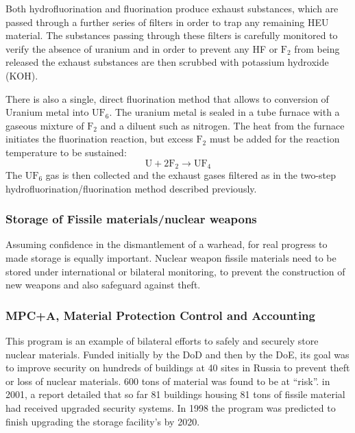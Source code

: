 \documentclass[twoside,titlepage,11pt,twocolumn,a4paper]{article}
\begin{document}
Both hydrofluorination and fluorination produce exhaust substances,
which are passed through a further series of filters in order to trap
any remaining HEU material. The substances passing through these
filters is carefully monitored to verify the absence of uranium and in
order to prevent any HF or \(\mathrm{F_2}\) from being released the
exhaust substances are then scrubbed with potassium hydroxide (KOH).

There is also a single, direct fluorination method that allows to
conversion of Uranium metal into \(\mathrm{UF_6}\). The uranium metal
is sealed in a tube furnace with a gaseous mixture of \(\mathrm{F_2}\)
and a diluent such as nitrogen. The heat from the furnace initiates
the fluorination reaction, but excess \(\mathrm{F_2}\) must be added
for the reaction temperature to be sustained: 
\[ \mathrm{ U + 2F_2 \rightarrow UF_4 } \]
The \(\mathrm{UF_6}\) gas is then collected and the exhaust gases
filtered as in the two-step hydrofluorination/fluorination method
described previously. \citep{dilutingUranium}

\subsubsection{Storage of Fissile materials/nuclear weapons}
Assuming confidence in the dismantlement of a warhead, for real
progress to made storage is equally important. Nuclear weapon fissile
materials need to be stored under international or bilateral
monitoring, to prevent the construction of new weapons and also
safeguard against theft.

\subsubsection{MPC+A, Material Protection Control and Accounting}
This program is an example of bilateral efforts to safely and securely
store nuclear materials. Funded initially by the DoD and then by the
DoE, its goal was to improve security on hundreds of buildings at 40
sites in Russia to prevent theft or loss of nuclear materials. 600
tons of material was found to be at ``risk''. in 2001, a report
detailed that so far 81 buildings housing 81 tons of fissile material
had received upgraded security systems. In 1998 the program was
predicted to finish upgrading the storage facility's by 2020. \citep{y12}
\end{document}
